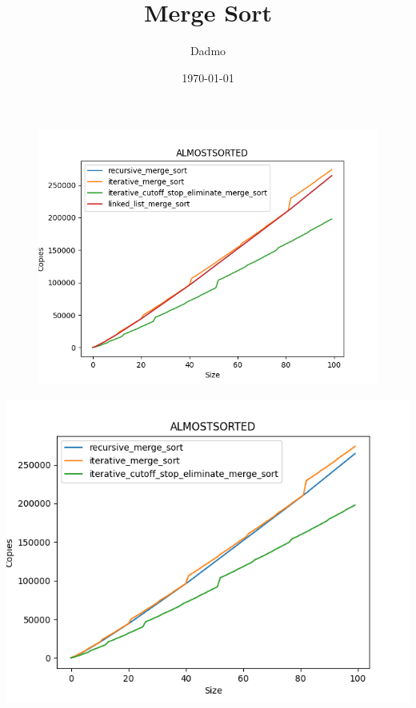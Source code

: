 \documentclass{article}
\begin{document}
\title{Merge Sort}
\author{Dadmo}
\date{\today}
\maketitle
\begin{figure}
\includegraphics{almostsorted_Copies_4_sorts.png}
\end{figure}
\includegraphics{almostsorted_Copies_3_sorts.png}
\end{document}
